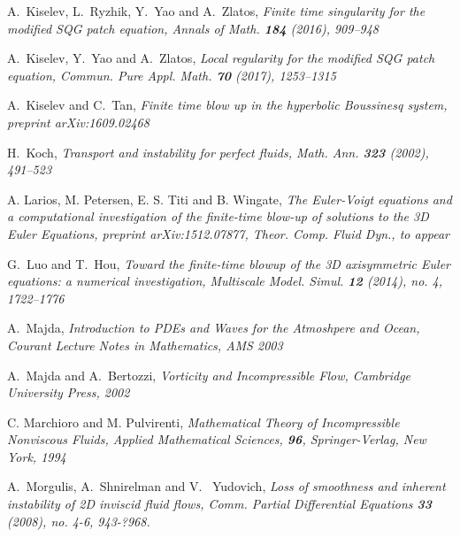 \documentclass[reqno,centertags, 11pt]{amsart}
\begin{document}
\begin{thebibliography}{99}
  A.~Kiselev, L.~Ryzhik, Y.~Yao and A.~Zlatos, \it Finite time singularity for the modified SQG patch equation, \rm
Annals of Math. {\bf 184} (2016), 909--948

  A.~Kiselev, Y.~Yao and A.~Zlatos, \it Local regularity for the modified SQG patch equation, \rm
Commun. Pure Appl. Math. {\bf 70} (2017), 1253--1315

 A.~Kiselev and C.~Tan, \it Finite time blow up in the hyperbolic Boussinesq system, \rm preprint arXiv:1609.02468

 H.~Koch, \it Transport and instability for perfect fluids, \rm Math. Ann. {\bf 323} (2002), 491--523

 A. Larios, M. Petersen, E. S. Titi and B. Wingate, \it The Euler-Voigt equations and a computational investigation
of the finite-time blow-up of solutions to the 3D Euler Equations, \rm preprint arXiv:1512.07877,  Theor. Comp. Fluid Dyn., to appear


 G.~Luo and T.~Hou, \it Toward the finite-time blowup of the 3D axisymmetric Euler equations: a numerical investigation,
\rm Multiscale Model. Simul. {\bf 12} (2014), no. 4, 1722--1776

 A.~Majda, \it Introduction to PDEs and Waves for the Atmoshpere and Ocean, \normalfont Courant Lecture Notes in
Mathematics, AMS 2003

 A.~Majda and A.~Bertozzi, \it Vorticity and
Incompressible Flow, \normalfont Cambridge University Press, 2002


  C. Marchioro and M. Pulvirenti, \it Mathematical Theory of Incompressible Nonviscous Fluids, \rm
Applied Mathematical Sciences, {\bf 96}, Springer-Verlag, New York, 1994


 A.~Morgulis, A.~Shnirelman and V.~ Yudovich, \it Loss of smoothness and inherent instability of 2D inviscid fluid flows,
\rm  Comm. Partial Differential Equations {\bf 33} (2008), no. 4-6, 943-?968.


\end{thebibliography}
\end{document}

